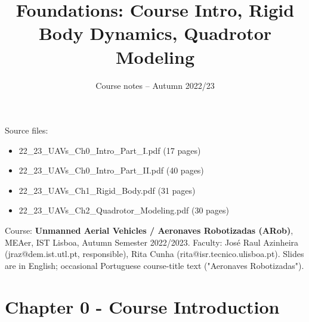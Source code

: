\documentclass[11pt]{article}
\title{Foundations: Course Intro, Rigid Body Dynamics, Quadrotor Modeling}
\author{Course notes -- Autumn 2022/23}
\date{}
\begin{document}
\maketitle
\tableofcontents
\vspace{1em}

Source files:
\begin{itemize}
\item 22\_\allowbreak{}23\_\allowbreak{}UAVs\_\allowbreak{}Ch0\_\allowbreak{}Intro\_\allowbreak{}Part\_\allowbreak{}I.pdf (17 pages)
\item 22\_\allowbreak{}23\_\allowbreak{}UAVs\_\allowbreak{}Ch0\_\allowbreak{}Intro\_\allowbreak{}Part\_\allowbreak{}II.pdf (40 pages)
\item 22\_\allowbreak{}23\_\allowbreak{}UAVs\_\allowbreak{}Ch1\_\allowbreak{}Rigid\_\allowbreak{}Body.pdf (31 pages)
\item 22\_\allowbreak{}23\_\allowbreak{}UAVs\_\allowbreak{}Ch2\_\allowbreak{}Quadrotor\_\allowbreak{}Modeling.pdf (30 pages)
\end{itemize}

Course: \textbf{Unmanned Aerial Vehicles / Aeronaves Robotizadas (ARob)}, MEAer, IST Lisboa, Autumn Semester 2022/2023.
Faculty: José Raul Azinheira (jraz@dem.ist.utl.pt, responsible), Rita Cunha (rita@isr.tecnico.ulisboa.pt).
Slides are in English; occasional Portuguese course-title text ("Aeronaves Robotizadas").

\section{Chapter 0 - Course Introduction}
\end{document}
